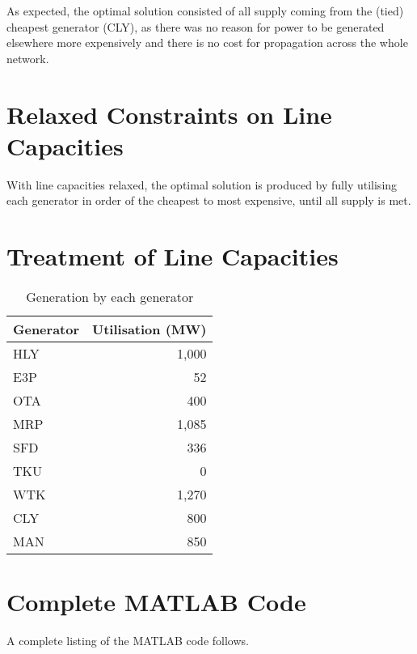 \documentclass[11pt]{article}
\begin{document}
As expected, the optimal solution consisted of all supply coming from the (tied) cheapest generator (CLY), as there was no reason for power to be generated elsewhere more expensively and there is no cost for propagation across the whole network. 

\section*{Relaxed Constraints on Line Capacities}
With line capacities relaxed, the optimal solution is produced by fully utilising each generator in order of the cheapest to most expensive, until all supply is met. 

\section*{Treatment of Line Capacities}

\begin{table}[h]
	\centering
	\begin{tabular}{@{}lr@{}}
	\toprule
	Generator & Utilisation (MW) \\ \midrule
	HLY       & 1,000             \\
	E3P       & 52               \\
	OTA       & 400              \\
	MRP       & 1,085             \\
	SFD       & 336              \\
	TKU       & 0                \\
	WTK       & 1,270             \\
	CLY       & 800              \\
	MAN       & 850              \\ \bottomrule
	\end{tabular}
	\caption{Generation by each generator}
\end{table}




\newpage
\section*{Complete MATLAB Code}
A complete listing of the MATLAB code follows. 

\inputminted{matlab}{main.m}
\end{document}
